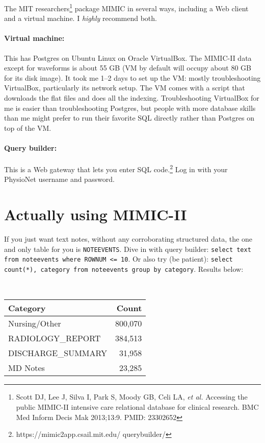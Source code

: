 \documentclass{tufte-handout}
\begin{document}
The MIT researchers\footnote{Scott DJ, Lee J, Silva I, Park S, Moody
  GB, Celi LA, \emph{et al.} Accessing the public MIMIC-II intensive
  care relational database for clinical research. BMC Med Inform Decis
  Mak 2013;13:9. PMID: 23302652 } package MIMIC in several ways,
including a Web client and a virtual machine. I \emph{highly}
recommend both.

\paragraph{Virtual machine:} This has Postgres on Ubuntu Linux on Oracle
VirtualBox. The MIMIC-II data except for waveforms is about 55 GB (VM
by default will occupy about 80 GB for its disk image). It took me
1--2 days to set up the VM: mostly troubleshooting VirtualBox,
particularly its network setup. The VM comes with a script that
downloads the flat files and does all the indexing. Troubleshooting
VirtualBox for me is easier than troubleshooting Postgres, but people
with more database skills than me might prefer to run their favorite
SQL directly rather than Postgres on top of the VM.

\paragraph{Query builder:} This is a Web gateway that lets you enter
SQL code.\footnote{https://mimic2app.csail.mit.edu/ querybuilder/} Log
in with your PhysioNet username and password.

\section{Actually using MIMIC-II}

If you just want text notes, without any corroborating structured
data, the one and only table for you is \texttt{NOTEEVENTS}. Dive in
with query builder: \texttt{select text from noteevents where ROWNUM
  <= 10}. Or also try (be patient): \texttt{select count(*), category
  from noteevents group by category}. Results below:

~\\

\begin{tabular}{l r}
\hline
Category & Count \\
\hline
Nursing/Other & 800,070 \\
RADIOLOGY\_REPORT & 384,513 \\
DISCHARGE\_SUMMARY & 31,958 \\
MD Notes & 23,285 \\
\hline
\end{tabular}
\end{document}
